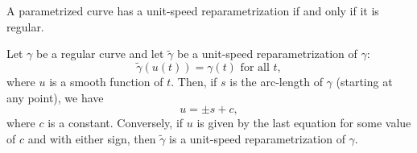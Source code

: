\begin{proposition}
  A parametrized curve has a unit-speed reparametrization if and only if it is regular.
\end{proposition}

\begin{corollary}
  Let $\gamma$ be a regular curve and let $\tilde \gamma$ be a unit-speed reparametrization of $\gamma$:
  \[
    \tilde \gamma(u(t)) = \gamma(t) \text{ for all } t,
  \]
  where $u$ is a smooth function of $t$.
  Then, if $s$ is the arc-length of $\gamma$ (starting at any point), we have
  \[
    u = \pm s + c,
  \]
  where $c$ is a constant.
  Conversely, if $u$ is given by the last equation for some value of $c$ and with either sign,
  then $\tilde \gamma$ is a unit-speed reparametrization of $\gamma$.
\end{corollary}

